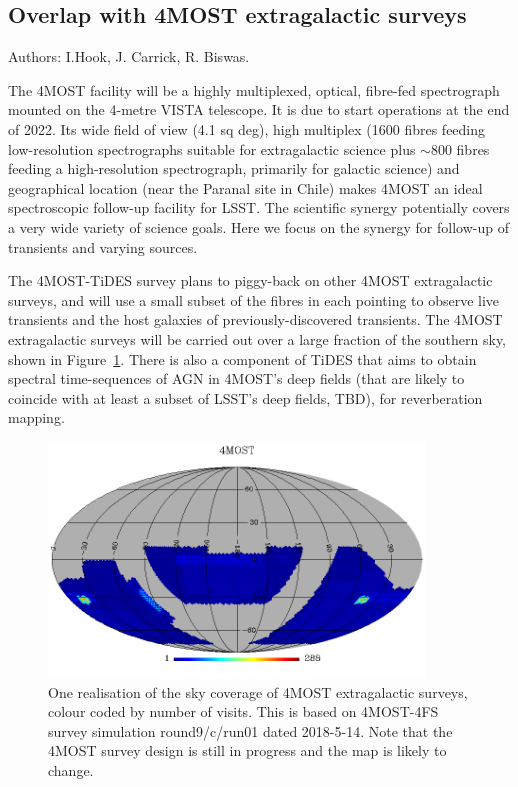 \documentclass[a4paper,10pt]{article}
\begin{document}
\subsection{Overlap with 4MOST extragalactic surveys}

Authors: I.Hook, J. Carrick, R. Biswas.

\vspace{0.2cm}

The 4MOST facility will be a highly multiplexed, optical, fibre-fed
spectrograph mounted on the 4-metre VISTA telescope. It is due to
start operations at the end of 2022. Its wide field of view (4.1 sq
deg), high multiplex (1600 fibres feeding low-resolution spectrographs
suitable for extragalactic science plus $\sim 800$ fibres feeding a
high-resolution spectrograph, primarily for galactic science) and
geographical location (near the Paranal site in Chile) makes 4MOST an
ideal spectroscopic follow-up facility for LSST. The scientific
synergy potentially covers a very wide variety of science goals. Here
we focus on the synergy for follow-up of transients and varying
sources.

The 4MOST-TiDES survey plans to piggy-back on other 4MOST
extragalactic surveys, and will use a small subset of the fibres in
each pointing to observe live transients and the host galaxies of
previously-discovered transients. The 4MOST extragalactic surveys will
be carried out over a large fraction of the southern sky, shown in
Figure~\ref{4most_sky}.  There is also a component of TiDES that aims
to obtain spectral time-sequences of AGN in 4MOST's deep fields (that
are likely to coincide with at least a subset of LSST's deep fields,
TBD), for reverberation mapping.


\begin{figure}[hc]
\begin{centering}
  \includegraphics[width=10.0cm]{4most_fndep.png}
\end{centering}

\caption{One realisation of the sky coverage of 4MOST extragalactic
  surveys, colour coded by number of visits. This is based on
  4MOST-4FS survey simulation round9/c/run01 dated 2018-5-14. Note
  that the 4MOST survey design is still in progress and the map is
  likely to change.}
\label{4most_sky}
\end{figure}
\end{document}
